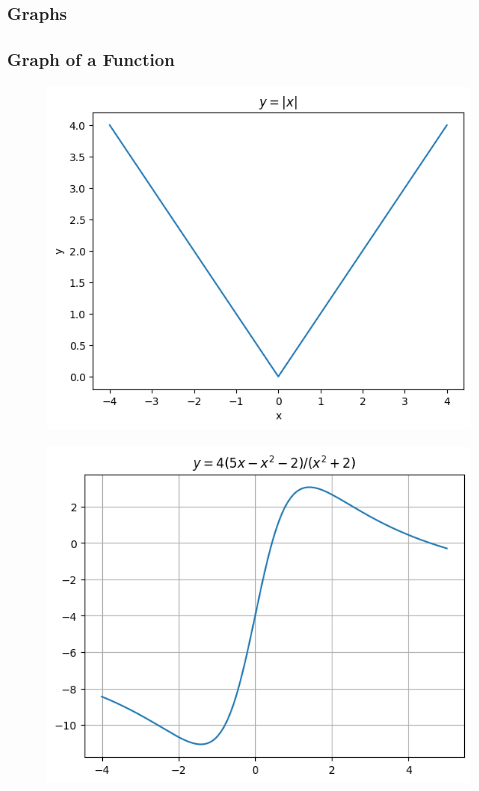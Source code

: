 \documentclass{beamer}
\begin{document}
\subsubsection{Graphs}
\begin{frame}
  \frametitle{Graph of a Function}
  \begin{figure}[h]    
    \centering
    \includegraphics[scale=0.3]{graph.png}
\end{figure}
\begin{figure}[h]    
  \centering
  \includegraphics[scale=0.3]{graph2.png}
\end{figure}
\end{frame}
\end{document}
